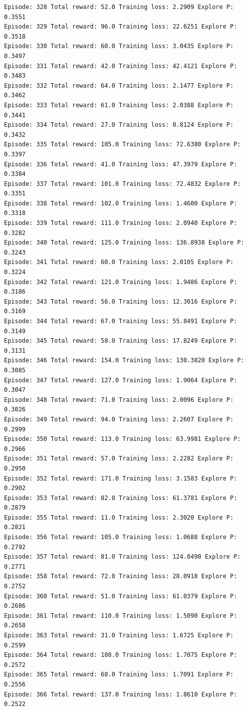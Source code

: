 \documentclass[11pt]{article}
\begin{document}
\begin{Verbatim}[commandchars=\\\{\}]
Episode: 328 Total reward: 52.0 Training loss: 2.2909 Explore P: 0.3551
Episode: 329 Total reward: 96.0 Training loss: 22.6251 Explore P: 0.3518
Episode: 330 Total reward: 60.0 Training loss: 3.0435 Explore P: 0.3497
Episode: 331 Total reward: 42.0 Training loss: 42.4121 Explore P: 0.3483
Episode: 332 Total reward: 64.0 Training loss: 2.1477 Explore P: 0.3462
Episode: 333 Total reward: 61.0 Training loss: 2.0388 Explore P: 0.3441
Episode: 334 Total reward: 27.0 Training loss: 0.8124 Explore P: 0.3432
Episode: 335 Total reward: 105.0 Training loss: 72.6380 Explore P: 0.3397
Episode: 336 Total reward: 41.0 Training loss: 47.3979 Explore P: 0.3384
Episode: 337 Total reward: 101.0 Training loss: 72.4832 Explore P: 0.3351
Episode: 338 Total reward: 102.0 Training loss: 1.4600 Explore P: 0.3318
Episode: 339 Total reward: 111.0 Training loss: 2.0940 Explore P: 0.3282
Episode: 340 Total reward: 125.0 Training loss: 136.8938 Explore P: 0.3243
Episode: 341 Total reward: 60.0 Training loss: 2.0105 Explore P: 0.3224
Episode: 342 Total reward: 121.0 Training loss: 1.9486 Explore P: 0.3186
Episode: 343 Total reward: 56.0 Training loss: 12.3016 Explore P: 0.3169
Episode: 344 Total reward: 67.0 Training loss: 55.8491 Explore P: 0.3149
Episode: 345 Total reward: 58.0 Training loss: 17.8249 Explore P: 0.3131
Episode: 346 Total reward: 154.0 Training loss: 130.3820 Explore P: 0.3085
Episode: 347 Total reward: 127.0 Training loss: 1.9064 Explore P: 0.3047
Episode: 348 Total reward: 71.0 Training loss: 2.0096 Explore P: 0.3026
Episode: 349 Total reward: 94.0 Training loss: 2.2607 Explore P: 0.2999
Episode: 350 Total reward: 113.0 Training loss: 63.9981 Explore P: 0.2966
Episode: 351 Total reward: 57.0 Training loss: 2.2282 Explore P: 0.2950
Episode: 352 Total reward: 171.0 Training loss: 3.1583 Explore P: 0.2902
Episode: 353 Total reward: 82.0 Training loss: 61.3781 Explore P: 0.2879
Episode: 355 Total reward: 11.0 Training loss: 2.3020 Explore P: 0.2821
Episode: 356 Total reward: 105.0 Training loss: 1.0688 Explore P: 0.2792
Episode: 357 Total reward: 81.0 Training loss: 124.0490 Explore P: 0.2771
Episode: 358 Total reward: 72.0 Training loss: 28.0910 Explore P: 0.2752
Episode: 360 Total reward: 51.0 Training loss: 61.0379 Explore P: 0.2686
Episode: 361 Total reward: 110.0 Training loss: 1.5090 Explore P: 0.2658
Episode: 363 Total reward: 31.0 Training loss: 1.6725 Explore P: 0.2599
Episode: 364 Total reward: 108.0 Training loss: 1.7075 Explore P: 0.2572
Episode: 365 Total reward: 68.0 Training loss: 1.7091 Explore P: 0.2556
Episode: 366 Total reward: 137.0 Training loss: 1.8610 Explore P: 0.2522

\end{Verbatim}
\end{document}
